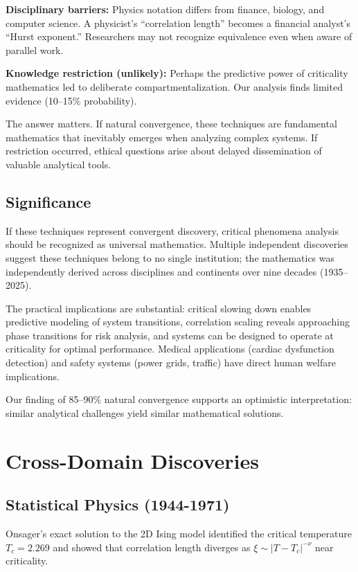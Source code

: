 \documentclass[11pt]{article}
\begin{document}
\textbf{Disciplinary barriers:} Physics notation differs from finance, biology, and computer science. A physicist's ``correlation length'' becomes a financial analyst's ``Hurst exponent.'' Researchers may not recognize equivalence even when aware of parallel work.

\textbf{Knowledge restriction (unlikely):} Perhaps the predictive power of criticality mathematics led to deliberate compartmentalization. Our analysis finds limited evidence (10--15\% probability).

The answer matters. If natural convergence, these techniques are fundamental mathematics that inevitably emerges when analyzing complex systems. If restriction occurred, ethical questions arise about delayed dissemination of valuable analytical tools.

\subsection{Significance}

If these techniques represent convergent discovery, critical phenomena analysis should be recognized as universal mathematics. Multiple independent discoveries suggest these techniques belong to no single institution; the mathematics was independently derived across disciplines and continents over nine decades (1935--2025).

The practical implications are substantial: critical slowing down enables predictive modeling of system transitions, correlation scaling reveals approaching phase transitions for risk analysis, and systems can be designed to operate at criticality for optimal performance. Medical applications (cardiac dysfunction detection) and safety systems (power grids, traffic) have direct human welfare implications.

Our finding of 85--90\% natural convergence supports an optimistic interpretation: similar analytical challenges yield similar mathematical solutions.

\section{Cross-Domain Discoveries}

\subsection{Statistical Physics (1944-1971)}

Onsager's exact solution to the 2D Ising model \cite{onsager1944} identified the critical temperature $T_c = 2.269$ and showed that correlation length diverges as $\xi \sim |T - T_c|^{-\nu}$ near criticality.
\end{document}
